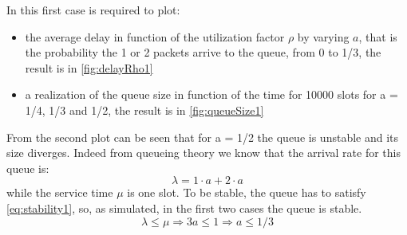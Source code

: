 \documentclass[11pt,a4paper]{article}
\begin{document}
In this first case is required to plot:
\begin{itemize}
\item the average delay in function of the utilization factor $\rho$ by varying $a$, that is the probability the 1 or 2 packets arrive to the queue, from 0 to 1/3, the result is in \autoref{fig:delayRho1}
\item a realization of the queue size in function of the time for 10000 slots for a = 1/4, 1/3 and 1/2, the result is in \autoref{fig:queueSize1}
\end{itemize}

From the second plot can be seen that for a = 1/2 the queue is unstable and its size diverges. Indeed from queueing theory we know that the arrival rate for this queue is:
\begin{equation}
  \lambda = 1 \cdot a + 2 \cdot a
\end{equation}
while the service time $\mu$ is one slot. To be stable, the queue has to satisfy \autoref{eq:stability1}, so, as simulated, in the first two cases the queue is stable.
\begin{equation}
  \label{eq:stability1}
  \lambda \le \mu \Rightarrow 3a \le 1 \Rightarrow a \le 1/3
\end{equation}

\subsection{}
\label{ex:1.2}
\end{document}

